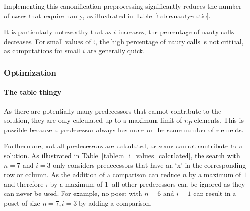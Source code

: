 \documentclass[twoside,leqno,twocolumn]{article}
\begin{document}
Implementing this canonification preprocessing significantly reduces the number of cases that require nauty, as illustrated in Table~\ref{table:nauty-ratio}.

\begin{table}[!t]
  \renewcommand{\arraystretch}{1.2}
  \caption{Percentage of canonification requiring nauty for variable $n$ and $i$, where lower values are preferable.}
  \label{table:nauty-ratio}
  \centering
\end{table}

It is particularly noteworthy that as $i$ increases, the percentage of nauty calls decreases.
For small values of $i$, the high percentage of nauty calls is not critical, as computations for small $i$ are generally quick.

\subsubsection{Optimization}

\paragraph{The table thingy}
As there are potentially many predecessors that cannot contribute to the solution, they are only calculated up to a maximum limit of $n_P$ elements. This is possible because a predecessor always has more or the same number of elements.

Furthermore, not all predecessors are calculated, as some cannot contribute to a solution.
As illustrated in Table~\ref{table:n_i_values_calculated}, the search with $n = 7$ and $i = 3$ only considers predecessors that have an `x' in the corresponding row or column. As the addition of a comparison can reduce $n$ by a maximum of $1$ and therefore $i$ by a maximum of $1$, all other predecessors can be ignored as they can never be used.
For example, no poset with $n = 6$ and $i = 1$ can result in a poset of size $n = 7, i = 3$ by adding a comparison.
\end{document}
